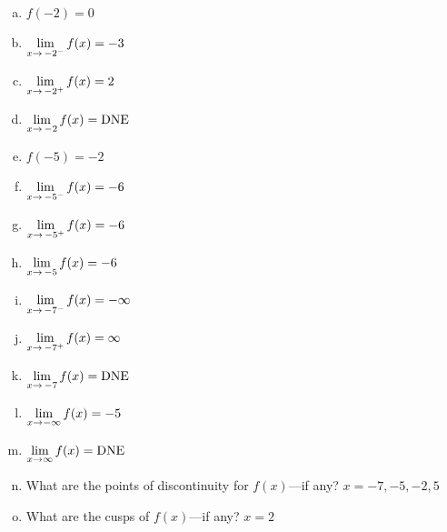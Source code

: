 \documentclass[12pt,letterpaper]{exam}
\begin{document}
\begin{questions}
\begin{enumerate}[(a)]
\item $f(-2)= 0$ \vfill
\item $\displaystyle\lim_{x \to \,-2^-} f(x)= -3$ \vfill
\item $\displaystyle\lim_{x \to \,-2^+} f(x)= 2$ \vfill
\item $\displaystyle\lim_{x \to \,-2} f(x)= \text{DNE}$ \vfill
\item $f(-5)= -2$ \vfill
\item $\displaystyle\lim_{x \to \,-5^-} f(x)= -6$ \vfill
\item $\displaystyle\lim_{x \to \,-5^+} f(x)= -6$ \vfill
\item $\displaystyle\lim_{x \to \,-5} f(x)= -6$ \vfill
\item $\displaystyle\lim_{x \to \,-7^-} f(x)= -\infty$ \vfill
\item $\displaystyle\lim_{x \to \,-7^+} f(x)= \infty$ \vfill
\item $\displaystyle\lim_{x \to \,-7} f(x)= \text{DNE}$ \vfill
\item $\displaystyle\lim_{x \to -\infty} f(x)= -5$ \vfill
\item $\displaystyle\lim_{x \to \infty} f(x)= \text{DNE}$ \vfill
\item What are the points of discontinuity for $f(x)$---if any? \quad $x= -7, -5, -2, 5$ \vfill
\item What are the cusps of $f(x)$---if any? \quad $x= 2$ \vfill
\end{enumerate}




\end{questions}
\end{document}
